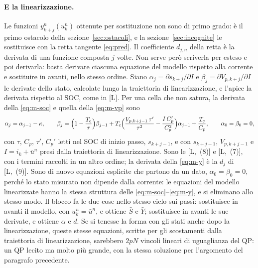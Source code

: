 \documentclass[11pt,a4paper]{article}
\newcommand{\file}[1]{\texttt{\detokenize{#1}}}
\newcommand{\rif}{[L]}                      %
\begin{document}
\paragraph{E la linearizzazione.} Le funzioni $y^n_{k+j}(u^n_k)$ ottenute per
sostituzione non sono di primo grado: è il primo ostacolo della
sezione~\ref{sec:ostacoli}, e la sezione~\ref{sec:incognite} le sostituisce
con la retta tangente \eqref{eq:pred}. Il coefficiente $d_{j,n}$ della retta è
la derivata di una funzione composta $j$ volte. Non serve però scriverla per
esteso e poi derivarla: basta derivare ciascuna equazione del modello rispetto
alla corrente e sostituire in avanti, nello stesso ordine. Siano
$\alpha_j = \partial s_{k+j} / \partial I$ e
$\beta_j = \partial V_{p,k+j} / \partial I$ le derivate dello stato, calcolate
lungo la traiettoria di linearizzazione, e l'apice la derivata rispetto al SOC,
come in \rif. Per una cella che non satura, la derivata della
\eqref{eq:m-soc} e quella della \eqref{eq:m-vp} sono
\[
  \alpha_j = \alpha_{j-1} - \kappa , \qquad
  \beta_j = \Bigl(1 - \frac{T_c}{\tau}\Bigr)\beta_{j-1}
            + T_c \Bigl(\frac{V_{p,k+j-1}\,\tau'}{\tau^2}
                        - \frac{I\,C_p'}{C_p^2}\Bigr)\alpha_{j-1}
            + \frac{T_c}{C_p} ,
  \qquad \alpha_0 = \beta_0 = 0 ,
\]
con $\tau$, $C_p$, $\tau'$, $C_p'$ letti nel SOC di inizio passo,
$s_{k+j-1}$, e con $s_{k+j-1}$, $V_{p,k+j-1}$ e $I = i_k + \bar u^n$ presi dalla
traiettoria di linearizzazione. Sono le [L,~(8)] e [L,~(7)], con i termini raccolti in un altro
ordine; la derivata della \eqref{eq:m-y} è la $d_j$ di [L,~(9)]. Sono di nuovo
equazioni esplicite che partono da un dato, $\alpha_0 = \beta_0 = 0$, perché lo
stato misurato non dipende dalla corrente: le equazioni del modello
linearizzate hanno la stessa struttura delle
\eqref{eq:m-soc}--\eqref{eq:m-y}, e si eliminano allo stesso modo. Il blocco
\file{Predizione_linearizzata} fa le due cose nello stesso ciclo sui passi:
sostituisce in avanti il modello, con $u^n_k = \bar u^n$, e ottiene $\bar S$ e
$\bar Y$; sostituisce in avanti le sue derivate, e ottiene $\alpha$ e $d$. Se
si tenesse la forma con gli stati anche dopo la linearizzazione, queste stesse
equazioni, scritte per gli scostamenti dalla traiettoria di linearizzazione,
sarebbero $2pN$ vincoli lineari di uguaglianza del QP: un QP lecito ma molto
più grande, con la stessa soluzione per l'argomento del paragrafo precedente.
\end{document}
